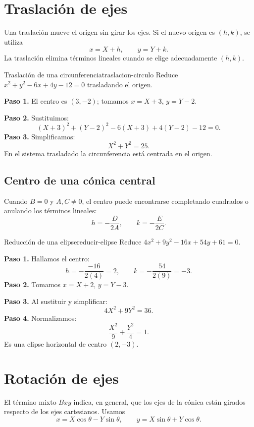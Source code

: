 \section{Traslación de ejes}

Una traslación mueve el origen sin girar los ejes. Si el nuevo origen es
$(h,k)$, se utiliza
\[
x=X+h,\qquad y=Y+k.
\]
La traslación elimina términos lineales cuando se elige adecuadamente $(h,k)$.

\begin{example}{Traslación de una circunferencia}{traslacion-circulo}
Reduce $x^2+y^2-6x+4y-12=0$ trasladando el origen.
\begin{solution}
\textbf{Paso 1.} El centro es $(3,-2)$; tomamos $x=X+3$, $y=Y-2$.

\textbf{Paso 2.} Sustituimos:
\[
(X+3)^2+(Y-2)^2-6(X+3)+4(Y-2)-12=0.
\]
\textbf{Paso 3.} Simplificamos:
\[
X^2+Y^2=25.
\]
En el sistema trasladado la circunferencia está centrada en el origen.
\end{solution}
\end{example}

\subsection{Centro de una cónica central}

Cuando $B=0$ y $A,C\neq0$, el centro puede encontrarse completando cuadrados
o anulando los términos lineales:
\[
h=-\frac{D}{2A},\qquad k=-\frac{E}{2C}.
\]

\begin{example}{Reducción de una elipse}{reducir-elipse}
Reduce $4x^2+9y^2-16x+54y+61=0$.
\begin{solution}
\textbf{Paso 1.} Hallamos el centro:
\[
h=-\frac{-16}{2(4)}=2,
\qquad
k=-\frac{54}{2(9)}=-3.
\]
\textbf{Paso 2.} Tomamos $x=X+2$, $y=Y-3$.

\textbf{Paso 3.} Al sustituir y simplificar:
\[
4X^2+9Y^2=36.
\]
\textbf{Paso 4.} Normalizamos:
\[
\frac{X^2}{9}+\frac{Y^2}{4}=1.
\]
Es una elipse horizontal de centro $(2,-3)$.
\end{solution}
\end{example}

\section{Rotación de ejes}

El término mixto $Bxy$ indica, en general, que los ejes de la cónica están
girados respecto de los ejes cartesianos. Usamos
\[
x=X\cos\theta-Y\sin\theta,
\qquad
y=X\sin\theta+Y\cos\theta.
\]

